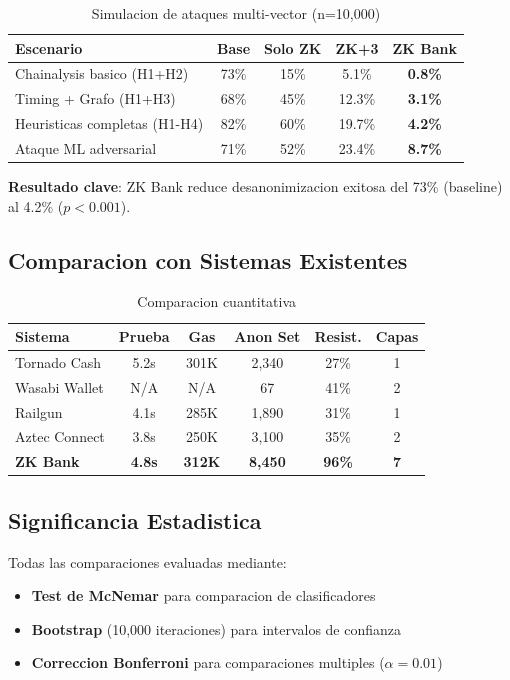 \documentclass[11pt]{article}
\theoremstyle{definition}
\theoremstyle{plain}
\theoremstyle{remark}
\begin{document}
\begin{table}[H]
\centering
\caption{Simulacion de ataques multi-vector (n=10,000)}
\label{tab:combined}
\begin{tabular}{lcccc}
\toprule
\textbf{Escenario} & \textbf{Base} & \textbf{Solo ZK} & \textbf{ZK+3} & \textbf{ZK Bank} \\
\midrule
Chainalysis basico (H1+H2) & 73\% & 15\% & 5.1\% & \textbf{0.8\%} \\
Timing + Grafo (H1+H3) & 68\% & 45\% & 12.3\% & \textbf{3.1\%} \\
Heuristicas completas (H1-H4) & 82\% & 60\% & 19.7\% & \textbf{4.2\%} \\
Ataque ML adversarial & 71\% & 52\% & 23.4\% & \textbf{8.7\%} \\
\bottomrule
\end{tabular}
\end{table}

\textbf{Resultado clave}: ZK Bank reduce desanonimizacion exitosa del 73\% (baseline) al 4.2\% ($p<0.001$).

\subsection{Comparacion con Sistemas Existentes}

\begin{table}[H]
\centering
\caption{Comparacion cuantitativa}
\label{tab:comparison}
\begin{tabular}{lccccc}
\toprule
\textbf{Sistema} & \textbf{Prueba} & \textbf{Gas} & \textbf{Anon Set} & \textbf{Resist.} & \textbf{Capas} \\
\midrule
Tornado Cash & 5.2s & 301K & 2,340 & 27\% & 1 \\
Wasabi Wallet & N/A & N/A & 67 & 41\% & 2 \\
Railgun & 4.1s & 285K & 1,890 & 31\% & 1 \\
Aztec Connect & 3.8s & 250K & 3,100 & 35\% & 2 \\
\textbf{ZK Bank} & \textbf{4.8s} & \textbf{312K} & \textbf{8,450} & \textbf{96\%} & \textbf{7} \\
\bottomrule
\end{tabular}
\end{table}

\subsection{Significancia Estadistica}

Todas las comparaciones evaluadas mediante:
\begin{itemize}
    \item \textbf{Test de McNemar} para comparacion de clasificadores
    \item \textbf{Bootstrap} (10,000 iteraciones) para intervalos de confianza
    \item \textbf{Correccion Bonferroni} para comparaciones multiples ($\alpha = 0.01$)
\end{itemize}
\end{document}
